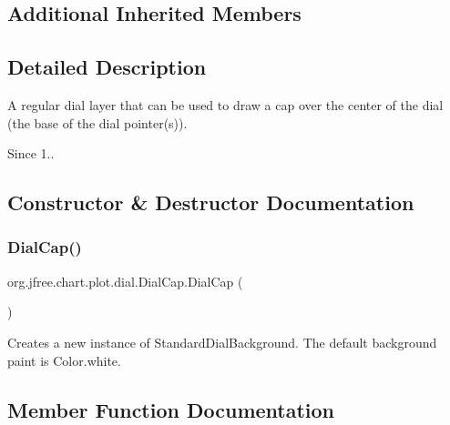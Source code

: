 \subsection*{Additional Inherited Members}


\subsection{Detailed Description}
A regular dial layer that can be used to draw a cap over the center of the dial (the base of the dial pointer(s)).

\begin{DoxySince}{Since}
1.. 
\end{DoxySince}


\subsection{Constructor \& Destructor Documentation}
\mbox{\label{classorg_1_1jfree_1_1chart_1_1plot_1_1dial_1_1_dial_cap_a5ff5011fcda51ce477430d54f2f6c908}} 
\subsubsection{\texorpdfstring{Dial\+Cap()}{DialCap()}}
{\footnotesize\ttfamily org.\+jfree.\+chart.\+plot.\+dial.\+Dial\+Cap.\+Dial\+Cap (\begin{DoxyParamCaption}{ }\end{DoxyParamCaption})}

Creates a new instance of {\ttfamily Standard\+Dial\+Background}. The default background paint is {\ttfamily Color.\+white}. 

\subsection{Member Function Documentation}
\mbox{\label{classorg_1_1jfree_1_1chart_1_1plot_1_1dial_1_1_dial_cap_a68ca1a29601bd9339c36113124a80b11}} 
